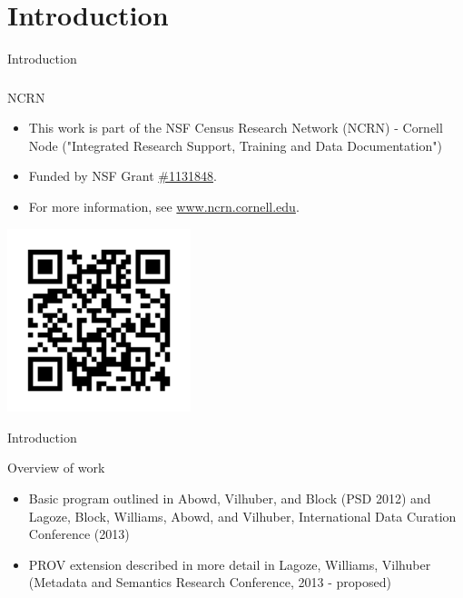 \section{Introduction}
\begin{frame}{Introduction}
\frametitle{}
\begin{block}{NCRN}
\begin{itemize}
\item This work is part of the NSF Census Research Network (NCRN) - Cornell Node ("Integrated Research Support, Training and Data Documentation")
\item Funded by NSF Grant \href{http://www.nsf.gov/awardsearch/showAward.do?AwardNumber=1131848}{\#1131848}. 
\item For more information, see \href{http://www.ncrn.cornell.edu}{www.ncrn.cornell.edu}.
\end{itemize}
\begin{center}
\href{http://www.ncrn.cornell.edu}{\includegraphics[width=0.4\textwidth]{qr-ncrn.png}}
\end{center}
\end{block}
\end{frame}

\begin{frame}{Introduction}
\begin{block}{Overview of work}
\begin{itemize}
\item Basic program outlined in Abowd, Vilhuber, and Block (PSD 2012) and Lagoze, Block, Williams, Abowd, and Vilhuber,  International Data Curation Conference (2013)
\item PROV extension described in more detail in Lagoze, Williams, Vilhuber (Metadata and Semantics Research Conference, 2013 - proposed)
\end{itemize}
\end{block}
\end{frame}

